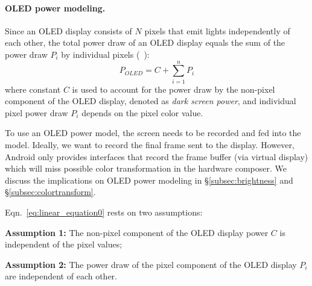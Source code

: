 \paragraph{OLED power modeling.}
Since an OLED display consists of $N$ pixels that emit lights
independently of each other, the total power draw of an OLED display
equals the sum of the power draw $P_i$ by individual pixels
(\eg~\cite{dong2009current,kim2013runtime}):
\begin{equation}
	P_{OLED} = C + \sum_{i=1}^{n}{P_i}
	\label{eq:linear_equation0}
\end{equation}
where constant $C$ is used to account for the 
power draw by
the non-pixel component of the OLED display,
denoted as {\em dark screen power},
and individual pixel power draw $P_i$ depends on
the pixel color value.

To use an OLED power model, the screen needs to be recorded and
fed into the model.  Ideally, we want to record the final frame 
sent to the display.  However, Android only provides interfaces that record
the frame buffer (via virtual display)  which will miss possible
color transformation in the hardware composer.  We discuss the implications
on OLED power modeling in \S\ref{subsec:brightness} and
\S\ref{subsec:colortransform}.


Eqn.~\ref{eq:linear_equation0} rests on two assumptions:

\noindent
{\bf Assumption 1:} The non-pixel component of the OLED display power $C$ is independent
of the pixel values;

\noindent
{\bf Assumption 2:} The power draw of the pixel component of the OLED display $P_i$
are independent of each other.
\fi


